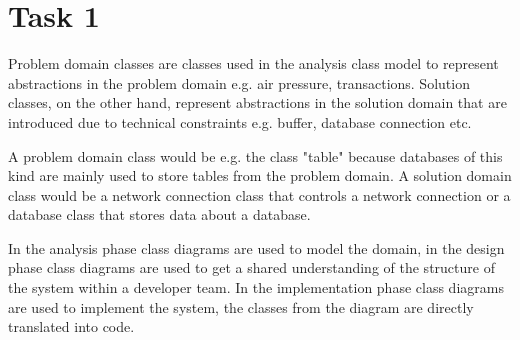 \chapter{Task 1}
\begin{parlist}

\item Problem domain classes are classes used in the analysis class model to represent abstractions in the problem domain e.g. air pressure, transactions. Solution classes, on the other hand, represent abstractions in the solution domain that are introduced due to technical constraints e.g. buffer, database connection etc.

\item A problem domain class would be e.g. the class "table" because databases of this kind are mainly used to store tables from the problem domain. A solution domain class would be a network connection class that controls a network connection or a database class that stores data about a database.

\item In the analysis phase class diagrams are used to model the domain, in the design phase class diagrams are used to get a shared understanding of the structure of the system within a developer team. In the implementation phase class diagrams are used to implement the system, the classes from the diagram are directly translated into code.


\end{parlist}
